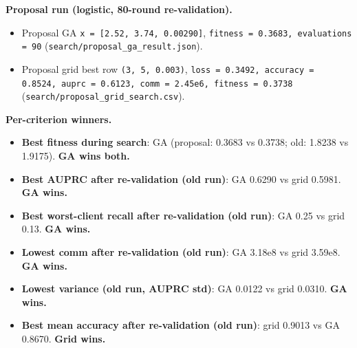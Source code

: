 \documentclass{article}
\begin{document}
\begin{table}[H]
  \centering
  \small
\end{table}


\textbf{Proposal run (logistic, 80-round re-validation).}

\begin{itemize}[leftmargin=1.4em,itemsep=2pt,topsep=2pt]
  \item Proposal GA \texttt{x = [2.52, 3.74, 0.00290]}, \texttt{fitness = 0.3683, evaluations = 90} (\texttt{search/proposal\_ga\_result.json}).
  \item Proposal grid best row \texttt{(3, 5, 0.003)}, \texttt{loss = 0.3492, accuracy = 0.8524, auprc = 0.6123, comm = 2.45e6, fitness = 0.3738} (\texttt{search/proposal\_grid\_search.csv}).
\end{itemize}


\textbf{Per-criterion winners.}

\begin{itemize}[leftmargin=1.4em,itemsep=2pt,topsep=2pt]
  \item \textbf{Best fitness during search}: GA (proposal: 0.3683 vs 0.3738; old: 1.8238 vs 1.9175). \textbf{GA wins both.}
  \item \textbf{Best AUPRC after re-validation (old run)}: GA 0.6290 vs grid 0.5981. \textbf{GA wins.}
  \item \textbf{Best worst-client recall after re-validation (old run)}: GA 0.25 vs grid 0.13. \textbf{GA wins.}
  \item \textbf{Lowest comm after re-validation (old run)}: GA 3.18e8 vs grid 3.59e8. \textbf{GA wins.}
  \item \textbf{Lowest variance (old run, AUPRC std)}: GA 0.0122 vs grid 0.0310. \textbf{GA wins.}
  \item \textbf{Best mean accuracy after re-validation (old run)}: grid 0.9013 vs GA 0.8670. \textbf{Grid wins.}
\end{itemize}
\end{document}
